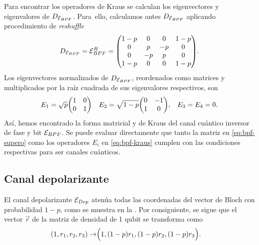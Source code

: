 Para encontrar los operadores de Kraus se calculan los eigenvectores
y eigenvalores de $D_{\mathcal{E}_{BPF}}$. Para~ello, calculamos antes
$D_{\mathcal{E}_{BPF}}$ aplicando procedimiento de \textit{reshuffle}
\begin{align}
  D_{\E_{BPF}}=\E_{BPF}^R=
  \mqty(
	 1-p & 0 & 0 & 1-p \\
	 0 & p & -p & 0 \\
	 0 & -p & p & 0 \\
	 1-p & 0 & 0 & 1-p
  ).
  \label{eq:Choi-E_bpf}
\end{align}
Los eigenvectores normalizados de $D_{\mathcal{E}_{BPF}}$, 
reordenados como matrices y multiplicados por 
la raíz cuadrada de sus eigenvalores respectivos, son
\begin{align}
E_1&=
\sqrt{p}
\mqty(
1 & 0\\
0 & 1
)&
E_2&=
\sqrt{1-p}
\mqty(
0 & -1\\
1 & 0
),
&E_3=E_4=0.
\label{eq:bpf-kraus}
\end{align}
Así, hemos encontrado la forma matricial y de Kraus del canal
cuántico inversor de fase y bit $\mathcal{E}_{BPF}$. Se puede evaluar directamente que 
tanto la matriz en \eqref{eq:bpf-supero} como los operadores $E_i$
en \eqref{eq:bpf-kraus} cumplen con las condiciones respectivas
para ser canales cuánticos.

\subsection{Canal depolarizante}
El canal depolarizante $\mathcal{E}_{Dep}$ 
atenúa todas las coordenadas 
del vector de Bloch con probabilidad $1-p$, como se muestra
en la . Por consiguiente, 
se sigue que el vector $\vec{r}$ de la matriz 
de densidad de 1 qubit se transforma como \cite{nielsen_chuang_2011}
\begin{align}
\qty(1,r_1,r_2,r_3)\rightarrow&\Big(1,\qty(1-p)r_1,\qty(1-p)r_2,\qty(1-p)r_3\Big).
\label{eq:depolarizing-bloch-vec}
\end{align}


